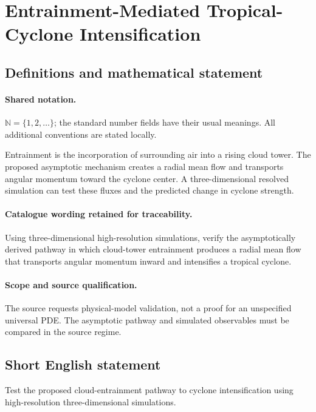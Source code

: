 \documentclass[11pt]{article}
\begin{document}
\section{Entrainment-Mediated Tropical-Cyclone Intensification}\label{statement}

\subsection{Definitions and mathematical statement}

\paragraph{Shared notation.}$\mathbb N=\{1,2,\ldots\}$; the standard number fields have their usual meanings. All additional conventions are stated locally.


Entrainment is the incorporation of surrounding air into a rising cloud tower. The proposed asymptotic mechanism creates a radial mean flow and transports angular momentum toward the cyclone center. A three-dimensional resolved simulation can test these fluxes and the predicted change in cyclone strength.

\paragraph{Catalogue wording retained for traceability.}
Using three-dimensional high-resolution simulations, verify the asymptotically derived pathway in which cloud-tower entrainment produces a radial mean flow that transports angular momentum inward and intensifies a tropical cyclone.

\paragraph{Scope and source qualification.}The source requests physical-model validation, not a proof for an unspecified universal PDE. The asymptotic pathway and simulated observables must be compared in the source regime.
\subsection{Short English statement}
Test the proposed cloud-entrainment pathway to cyclone intensification using high-resolution three-dimensional simulations.
\end{document}
